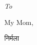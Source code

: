 \cleardoublepage
\thispagestyle{empty}
\vspace*{0.5\textheight}
\begin{center}
\textit{To}

My Mom,
\begin{sanskrit}
	निर्मला
\end{sanskrit}
\end{center}
\newpage